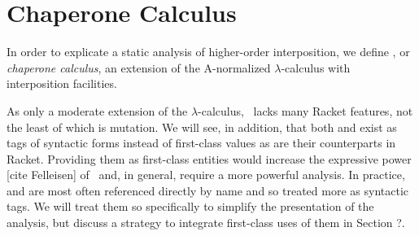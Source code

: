 \documentclass{sigplanconf}
\begin{document}






\section{Chaperone Calculus}

In order to explicate a static analysis of higher-order interposition, we define \chapcalc, or \emph{chaperone calculus}, an extension of the A-normalized $\lambda$-calculus with interposition facilities.

As only a moderate extension of the $\lambda$-calculus, \chapcalc\ lacks many Racket features, not the least of which is mutation.
We will see, in addition, that both  and  exist as tags of syntactic forms instead of first-class values as are their counterparts in Racket.
Providing them as first-class entities would increase the expressive power [cite Felleisen] of \chapcalc\ and, in general, require a more powerful analysis.
In practice,  and  are most often referenced directly by name and so treated more as syntactic tags.
We will treat them so specifically to simplify the presentation of the analysis, but discuss a strategy to integrate first-class uses of them in Section ?.
\end{document}
